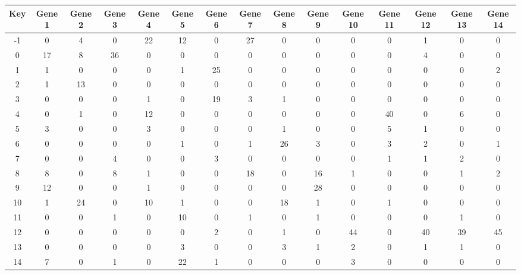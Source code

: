 \begin{tabular}{|c|c|c|c|c|c|c|c|c|c|c|c|c|c|c|}
\hline
Key & Gene 1 & Gene 2 & Gene 3 & Gene 4 & Gene 5 & Gene 6 & Gene 7 & Gene 8 & Gene 9 & Gene 10 & Gene 11 & Gene 12 & Gene 13 & Gene 14 \\
\hline
-1 & 0 & 4 & 0 & 22 & 12 & 0 & 27 & 0 & 0 & 0 & 0 & 1 & 0 & 0 \\
0 & 17 & 8 & 36 & 0 & 0 & 0 & 0 & 0 & 0 & 0 & 0 & 4 & 0 & 0 \\
1 & 1 & 0 & 0 & 0 & 1 & 25 & 0 & 0 & 0 & 0 & 0 & 0 & 0 & 2 \\
2 & 1 & 13 & 0 & 0 & 0 & 0 & 0 & 0 & 0 & 0 & 0 & 0 & 0 & 0 \\
3 & 0 & 0 & 0 & 1 & 0 & 19 & 3 & 1 & 0 & 0 & 0 & 0 & 0 & 0 \\
4 & 0 & 1 & 0 & 12 & 0 & 0 & 0 & 0 & 0 & 0 & 40 & 0 & 6 & 0 \\
5 & 3 & 0 & 0 & 3 & 0 & 0 & 0 & 1 & 0 & 0 & 5 & 1 & 0 & 0 \\
6 & 0 & 0 & 0 & 0 & 1 & 0 & 1 & 26 & 3 & 0 & 3 & 2 & 0 & 1 \\
7 & 0 & 0 & 4 & 0 & 0 & 3 & 0 & 0 & 0 & 0 & 1 & 1 & 2 & 0 \\
8 & 8 & 0 & 8 & 1 & 0 & 0 & 18 & 0 & 16 & 1 & 0 & 0 & 1 & 2 \\
9 & 12 & 0 & 0 & 1 & 0 & 0 & 0 & 0 & 28 & 0 & 0 & 0 & 0 & 0 \\
10 & 1 & 24 & 0 & 10 & 1 & 0 & 0 & 18 & 1 & 0 & 1 & 0 & 0 & 0 \\
11 & 0 & 0 & 1 & 0 & 10 & 0 & 1 & 0 & 1 & 0 & 0 & 0 & 1 & 0 \\
12 & 0 & 0 & 0 & 0 & 0 & 2 & 0 & 1 & 0 & 44 & 0 & 40 & 39 & 45 \\
13 & 0 & 0 & 0 & 0 & 3 & 0 & 0 & 3 & 1 & 2 & 0 & 1 & 1 & 0 \\
14 & 7 & 0 & 1 & 0 & 22 & 1 & 0 & 0 & 0 & 3 & 0 & 0 & 0 & 0 \\
\hline
\end{tabular}